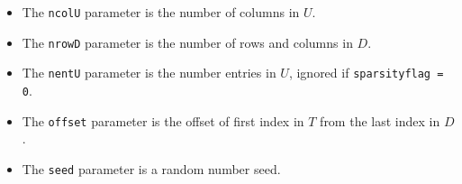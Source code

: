 \begin{enumerate}
\begin{itemize}
\item
The {\tt ncolU} parameter is the number of columns in $U$.
\item
The {\tt nrowD} parameter is the number of rows and columns in $D$.
\item
The {\tt nentU} parameter is the number entries in $U$, ignored if
{\tt sparsityflag = 0}.
\item
The {\tt offset} parameter is the offset of first index in $T$ from
the last index in $D$.
\item
The {\tt seed} parameter is a random number seed.
\end{itemize}
\end{enumerate}
